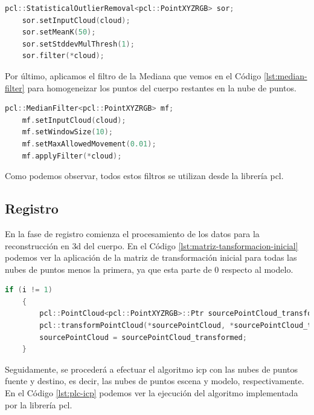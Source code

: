 \begin{lstlisting}[language={C++}, caption={Aplicación del Statistical Outlier Removal}, label={lst:statistical-outlier-removal}]
    pcl::StatisticalOutlierRemoval<pcl::PointXYZRGB> sor;
    sor.setInputCloud(cloud);
    sor.setMeanK(50);
    sor.setStddevMulThresh(1);
    sor.filter(*cloud);
\end{lstlisting}

Por último, aplicamos el filtro de la Mediana que vemos en el Código \ref{lst:median-filter} para homogeneizar los puntos del cuerpo restantes en la nube de puntos.

\begin{lstlisting}[language={C++}, caption={Aplicación del Filtro Mediana}, label={lst:median-filter}]
    pcl::MedianFilter<pcl::PointXYZRGB> mf;
    mf.setInputCloud(cloud);
    mf.setWindowSize(10);
    mf.setMaxAllowedMovement(0.01);
    mf.applyFilter(*cloud);
\end{lstlisting}

Como podemos observar, todos estos filtros se utilizan desde la librería \gls{pcl}.

\subsection{Registro}

En la fase de registro comienza el procesamiento de los datos para la reconstrucción en \gls{3d} del cuerpo. En el Código \ref{lst:matriz-tansformacion-inicial} podemos ver la aplicación de la matriz de transformación inicial para todas las nubes de puntos menos la primera, ya que esta parte de 0 respecto al modelo.

\begin{lstlisting}[language={C++}, caption={Matriz de transformación inicial}, label={lst:matriz-tansformacion-inicial}]
    if (i != 1)
    {
        pcl::PointCloud<pcl::PointXYZRGB>::Ptr sourcePointCloud_transformed(new pcl::PointCloud<pcl::PointXYZRGB>);
        pcl::transformPointCloud(*sourcePointCloud, *sourcePointCloud_transformed, initialTransformationMatrix);
        sourcePointCloud = sourcePointCloud_transformed;
    }
\end{lstlisting}

Seguidamente, se procederá a efectuar el algoritmo \gls{icp} con las nubes de puntos fuente y destino, es decir, las nubes de puntos escena y modelo, respectivamente. En el Código \ref{lst:plc-icp} podemos ver la ejecución del algoritmo implementada por la librería \gls{pcl}.

